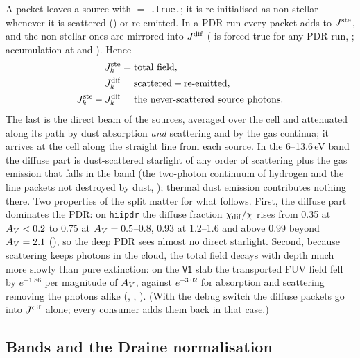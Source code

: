 A packet leaves a source with  $=$ \texttt{.true.}; it is
re-initialised as non-stellar whenever it is scattered
() or re-emitted. In a PDR run every packet adds
to $J^{\mathrm{ste}}$, and the non-stellar ones are mirrored into $J^{\mathrm{dif}}$
( is forced true for any PDR run,
; accumulation at
 and ). Hence
\begin{align}
  J^{\mathrm{ste}}_k &= \text{total field},\nonumber\\
  J^{\mathrm{dif}}_k &= \text{scattered} + \text{re-emitted},\\
  J^{\mathrm{ste}}_k - J^{\mathrm{dif}}_k &= \text{the never-scattered source photons}.\nonumber
\end{align}
The last is the direct beam of the sources, averaged over the cell and
attenuated along its path by dust absorption \emph{and} scattering and by the
gas continua; it arrives at the cell along the straight line from each source.
In the 6--13.6\,eV band the diffuse part is dust-scattered starlight of any
order of scattering plus the gas emission that falls in the band (the
two-photon continuum of hydrogen and the line packets not destroyed by dust,
); thermal dust emission contributes nothing there. Two properties
of the split matter for what follows. First, the diffuse part dominates the
PDR: on \texttt{hiipdr} the diffuse fraction $\chi_{\mathrm{dif}}/\chi$ rises from 0.35 at
$A_{V}<0.2$ to 0.75 at $A_{V}=0.5$--0.8, 0.93 at 1.2--1.6 and above 0.99 beyond
$A_{V}=2.1$ (), so the deep PDR sees almost no direct starlight.
Second, because scattering keeps photons in the cloud, the total field decays
with depth much more slowly than pure extinction: on the \texttt{V1} slab the
transported FUV field fell by $e^{-1.86}$ per magnitude of $A_{V}$, against
$e^{-3.02}$ for absorption and scattering removing the photons alike
(, , ). (With the debug
switch  the diffuse packets go into $J^{\mathrm{dif}}$ alone; every
consumer adds them back in that case.)

\subsection{Bands and the Draine normalisation}
\label{sec:bands}


